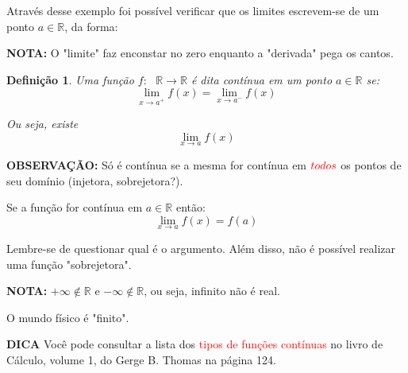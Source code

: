 \documentclass{book}
\newtheorem{defn}{Definição}
\numberwithin{defn}{chapter}
\numberwithin{exe}{chapter}
\numberwithin{ex}{chapter}
\numberwithin{obs}{chapter}
\numberwithin{fato}{chapter}
\numberwithin{resp}{chapter}
\begin{document}
Através desse exemplo foi possível verificar que os limites escrevem-se de um ponto $a\in\mathbb{R}$, da forma:
\begin{center}
\end{center}

\begin{center}
\end{center}



\textbf{NOTA:} O "limite" faz enconstar no zero enquanto a "derivada" pega os cantos.

\begin{defn}
    Uma função $f: \text{ }\mathbb R \rightarrow \mathbb R$ é dita contínua em um ponto $a \in\mathbb R$ se: 
\[\lim\limits_{x\to a^{+}}f(x) = \lim\limits_{x\to a^{-}}f(x)\]

\item Ou seja, existe 
\[\lim\limits_{x\to a}f(x)\] 
\end{defn}

\textbf{OBSERVAÇÃO:} Só é contínua se a mesma for contínua em $\textcolor{red}{todos}$ os pontos de seu domínio (injetora, sobrejetora?).

Se a função for contínua em $a\in\mathbb{R}$ então:
\[\lim\limits_{x\to a}f(x)=f(a)\]

Lembre-se de questionar qual é o argumento. Além disso, não é possível realizar uma função "sobrejetora".

\[\]
\textbf{NOTA:} $+\infty\notin\mathbb{R}$ e $-\infty\notin\mathbb{R}$, ou seja, infinito não é real. 

O mundo físico é "finito".
\[\]

\textbf{DICA} Você pode consultar a lista dos \textcolor{red}{tipos de funções contínuas} no livro de Cálculo, volume 1, do Gerge B. Thomas na página 124.
\end{document}
